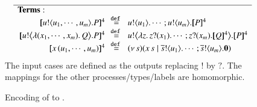 \begin{figure}[t]
\[\begin{array}{rcl}
\hline
{\bf Terms:}\hspace{2.5cm}\\
		\map{\bout{u}{u_1, \cdots, u_m} P}^{4}
		&\!\!\defeq\!\!&
		\bout{u}{u_1} \cdots ;  \bout{u}{u_m} \map{P}^{4}
		\\
		\map{\bbout{u}{\abs{(x_1, \cdots, x_m)} Q} P}^{4}
		&\!\!\defeq\!\!&
		\bbout{u}{\abs{z}\binp{z}{x_1}\cdots ; \binp{z}{x_m} \map{Q}^{4}} \map{P}^{4}
		\\ 
		\map{\appl{x}{(u_1, \cdots, u_m)}}^{4}
		&\!\!\defeq\!\!&
		\newsp{s}{\appl{x}{s} \Par \bout{\dual{s}}{u_1} \cdots ; \bout{\dual{s}}{u_m} \inact} 
        \\ 
	\end{array}
\]
The input cases are defined as the outputs replacing $!$ by $?$. 
The mappings for the other processes/types/labels are 
homomorphic. \\
\caption{\label{f:enc:poltomon}
Encoding of \PHOp to \HOp.
}
\Hlinefig 
\end{figure}

